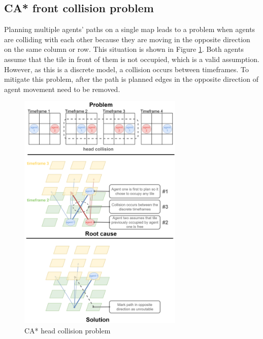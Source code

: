 \subsection{CA* front collision problem}
Planning multiple agents' paths on a single map leads to a problem when agents are colliding with each other because they are moving in the opposite direction on the same column or row. This situation is shown in Figure \ref{fig:head_collision}. Both agents assume that the tile in front of them is not occupied, which is a valid assumption. However, as this is a discrete model, a collision occurs between timeframes. To mitigate this problem, after the path is planned edges in the opposite direction of agent movement need to be removed.
\begin{figure}[H]
    \centering
    \includegraphics[width=0.7\textwidth]{pictures/head_collision_problem.png}
    \caption{CA* head collision problem}
    \label{fig:head_collision}
\end{figure}